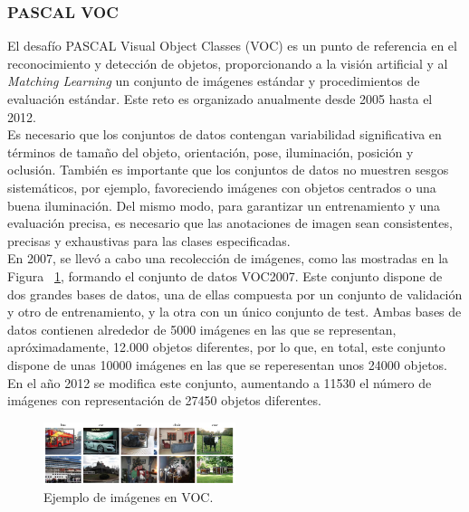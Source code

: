 \documentclass{bmvc2k}
\begin{document}
\subsubsection{PASCAL VOC}

El desafío PASCAL Visual Object Classes (VOC) \cite{coco_bib} es un punto de referencia en el reconocimiento y detección de objetos, proporcionando a la visión artificial y al \textit{Matching Learning} un conjunto de imágenes estándar y procedimientos de evaluación estándar. Este reto es organizado anualmente desde 2005 hasta el 2012.\\

Es necesario que los conjuntos de datos contengan variabilidad significativa en términos de tamaño del objeto, orientación, pose, iluminación, posición y oclusión. También es importante que los conjuntos de datos no muestren sesgos sistemáticos, por ejemplo, favoreciendo imágenes con objetos centrados o una buena iluminación. Del mismo modo,
para garantizar un entrenamiento y una evaluación precisa, es necesario que las anotaciones de imagen sean consistentes, precisas y exhaustivas para las clases especificadas.\\

En 2007, se llevó a cabo una recolección de imágenes, como las mostradas en la Figura ~\ref{fig.pascal}, formando el conjunto de datos VOC2007. Este conjunto dispone de dos grandes bases de datos, una de ellas compuesta por un conjunto de validación y otro de entrenamiento, y la otra con un único conjunto de test. Ambas bases de datos contienen alrededor de 5000 imágenes en las que se representan, apróximadamente, 12.000 objetos diferentes, por lo que, en total, este conjunto dispone de unas 10000 imágenes en las que se reperesentan unos 24000 objetos. En el año 2012 se modifica este conjunto, aumentando a 11530 el número de imágenes con representación de 27450 objetos diferentes.\\

\begin{figure}
\begin{center}
	\includegraphics[width=0.5\textwidth]{images/PASCAL.png}
   \caption{Ejemplo de imágenes en VOC.}
	\label{fig.pascal}
\end{center}
\end{figure}
\end{document}
